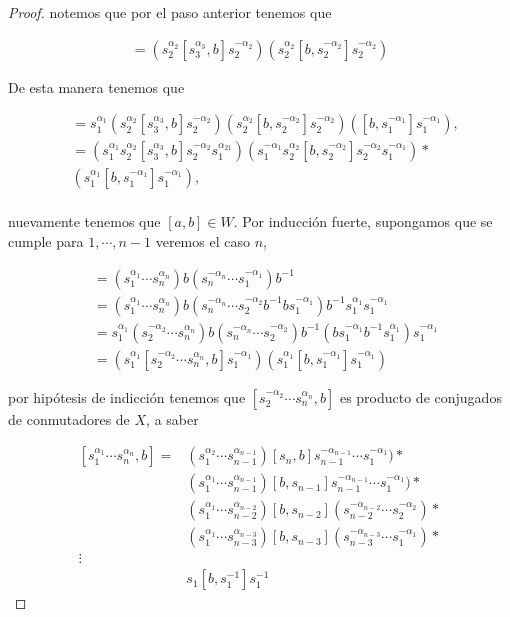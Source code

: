 \begin{proof}
notemos que por el paso anterior tenemos que

\begin{align*}
[s_2^{\alpha_2}s_3^{\alpha_3},b]=(s_2^{\alpha_2}[s_3^{\alpha_3},b]s_2^{-\alpha_2})(s_2^{\alpha_2}[b,s_2^{-\alpha_2}]s_2^{-\alpha_2})
\end{align*}

De esta manera tenemos que 

\begin{align*}
[s_1^{\alpha_1}s_2^{\alpha_2}s_3^{\alpha_3},b] & = s_1^{\alpha_1}(s_2^{\alpha_2}[s_3^{\alpha_3},b]s_2^{-\alpha_2})(s_2^{\alpha_2}[b,s_2^{-\alpha_2}]s_2^{-\alpha_2})([b,s_1^{-\alpha_1}]s_1^{-\alpha_1}),  \\
& = (s_1^{\alpha_1}s_2^{\alpha_2}[s_3^{\alpha_3},b]s_2^{-\alpha_2}s_1^{\alpha_21})(s_1^{-\alpha_1}s_2^{\alpha_2}[b,s_2^{-\alpha_2}]s_2^{-\alpha_2}s_1^{-\alpha_1})*\\ &  (s_1^{\alpha_1}[b,s_1^{-\alpha_1}]s_1^{-\alpha_1}),  \\
\end{align*}

nuevamente tenemos que $[a,b] \in W.$ Por inducción fuerte, supongamos que se cumple para $1, \cdots, n-1$ veremos el caso $n$,

\begin{align*}
[s_1^{\alpha_1} \cdots s_n^{\alpha_n},b] & =(s_1^{\alpha_1} \cdots s_n^{\alpha_n})b(s_n^{-\alpha_n} \cdots s_1^{-\alpha_1})b^{-1} \\
& = (s_1^{\alpha_1} \cdots s_n^{\alpha_n})b(s_n^{-\alpha_n} \cdots s_2^{-\alpha_2 }b^{-1}b s_1^{-\alpha_1})b^{-1}s_1^{\alpha_1}s_1^{-\alpha_1} \\
& = s_1^{\alpha_1}( s_2^{-\alpha_2 } \cdots s_n^{\alpha_n})b(s_n^{-\alpha_n} \cdots s_2^{-\alpha_2 })b^{-1}(b s_1^{-\alpha_1}b^{-1}s_1^{\alpha_1})s_1^{-\alpha_1} \\
& = (s_1^{\alpha_1}[ s_2^{-\alpha_2 } \cdots s_n^{\alpha_n},b]s_1^{-\alpha_1})(s_1^{\alpha_1}[b,s_1^{-\alpha_1}]s_1^{-\alpha_1})
\end{align*}



por hipótesis de indicción tenemos que $[ s_2^{-\alpha_2 } \cdots s_n^{\alpha_n},b]$ es producto de conjugados de conmutadores de $X$, a saber

\begin{align*}\label{eq:induccion}
[s_1^{\alpha_1} \cdots s_n^{\alpha_n},b]= & (s_1^{\alpha_2 } \cdots s_{n-1}^{\alpha_{n-1}})[s_n,b]s_{n-1}^{-\alpha_{n-1}} \cdots s_1^{-\alpha_1 })* \\ &(s_1^{\alpha_1 } \cdots s_{n-1}^{\alpha_{n-1}})[b,s_{n-1}]s_{n-1}^{-\alpha_{n-1}} \cdots s_1^{-\alpha_1 })* \\
& (s_1^{\alpha_1 } \cdots s_{n-2}^{\alpha_{n-2}})[b,s_{n-2}](s_{n-2}^{-\alpha_{n-2}} \cdots s_2^{-\alpha_2 })* \\
& (s_1^{\alpha_1 } \cdots s_{n-3}^{\alpha_{n-3}})[b,s_{n-3}](s_{n-3}^{-\alpha_{n-3}} \cdots s_1^{-\alpha_1 })* \\
\vdots \\
&  s_1[b,s_1^{-1}]s_1^{-1}
\end{align*}


\end{proof}
